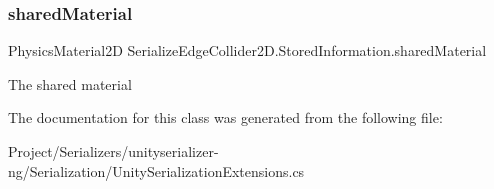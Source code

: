 \subsubsection{\texorpdfstring{shared\+Material}{sharedMaterial}}
{\footnotesize\ttfamily Physics\+Material2D Serialize\+Edge\+Collider2\+D.\+Stored\+Information.\+shared\+Material}



The shared material 



The documentation for this class was generated from the following file\+:\begin{DoxyCompactItemize}
\item 
Project/\+Serializers/unityserializer-\/ng/\+Serialization/Unity\+Serialization\+Extensions.\+cs\end{DoxyCompactItemize}

